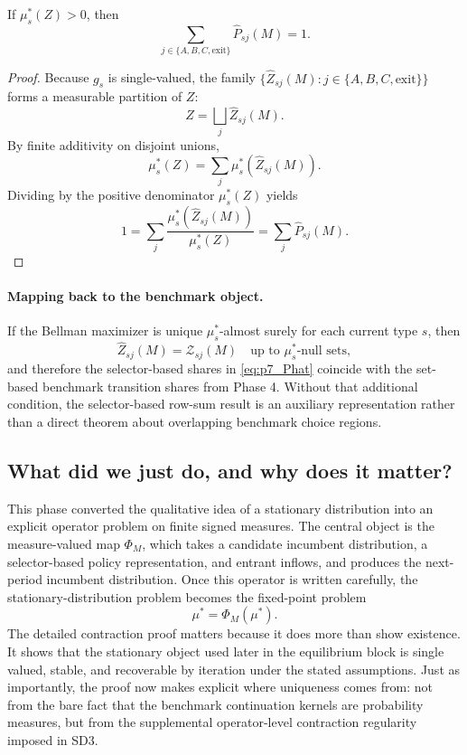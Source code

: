 \begin{lemma}
If $\mu_s^*(Z)>0$, then
\[
\sum_{j\in\{A,B,C,\mathrm{exit}\}}\widehat P_{sj}(M)=1.
\]
\end{lemma}

\begin{proof}
Because $g_s$ is single-valued, the family $\{\widehat Z_{sj}(M):j\in\{A,B,C,\mathrm{exit}\}\}$ forms a measurable partition of $Z$:
\[
Z=\bigsqcup_j \widehat Z_{sj}(M).
\]
By finite additivity on disjoint unions,
\[
\mu_s^*(Z)=\sum_j\mu_s^*(\widehat Z_{sj}(M)).
\]
Dividing by the positive denominator $\mu_s^*(Z)$ yields
\[
1=\sum_j\frac{\mu_s^*(\widehat Z_{sj}(M))}{\mu_s^*(Z)}
=\sum_j \widehat P_{sj}(M).
\]
\end{proof}

\paragraph{Mapping back to the benchmark object.}
If the Bellman maximizer is unique $\mu_s^*$-almost surely for each current type $s$, then
\[
\widehat Z_{sj}(M)=\mathcal Z_{sj}(M)
\quad\text{up to }\mu_s^*\text{-null sets},
\]
and therefore the selector-based shares in \eqref{eq:p7_Phat} coincide with the set-based benchmark transition shares from Phase 4. Without that additional condition, the selector-based row-sum result is an auxiliary representation rather than a direct theorem about overlapping benchmark choice regions.

\subsection{What did we just do, and why does it matter?}

This phase converted the qualitative idea of a stationary distribution into an explicit operator problem on finite signed measures. The central object is the measure-valued map $\Phi_M$, which takes a candidate incumbent distribution, a selector-based policy representation, and entrant inflows, and produces the next-period incumbent distribution. Once this operator is written carefully, the stationary-distribution problem becomes the fixed-point problem
\[
\mu^*=\Phi_M(\mu^*).
\]
The detailed contraction proof matters because it does more than show existence. It shows that the stationary object used later in the equilibrium block is single valued, stable, and recoverable by iteration under the stated assumptions. Just as importantly, the proof now makes explicit where uniqueness comes from: not from the bare fact that the benchmark continuation kernels are probability measures, but from the supplemental operator-level contraction regularity imposed in SD3.

